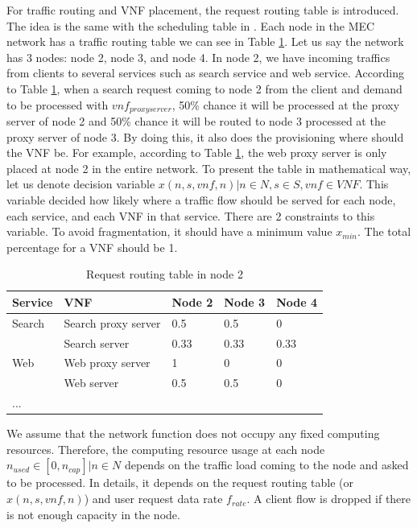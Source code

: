 \documentclass[conference]{IEEEtran}
\begin{document}
For traffic routing and VNF placement, the request routing table is introduced. The idea is the same with the scheduling table in \cite{9269087}. Each node in the MEC network has a traffic routing table we can see in Table \ref{tbl:traffic_routing}. Let us say the network has 3 nodes: node 2, node 3, and node 4. In node 2, we have incoming traffics from clients to several services such as search service and web service. According to Table \ref{tbl:traffic_routing}, when a search request coming to node 2 from the client and demand to be processed with $vnf_{proxy server}$, 50\% chance it will be processed at the proxy server of node 2 and 50\% chance it will be routed to node 3 processed at the proxy server of node 3. By doing this, it also does the provisioning where should the VNF be. For example, according to Table \ref{tbl:traffic_routing}, the web proxy server is only placed at node 2 in the entire network. To present the table in mathematical way, let us denote decision variable $x(n,s,vnf,n) | n \in N, s \in S, vnf \in VNF$. This variable decided how likely where a traffic flow should be served for each node, each service, and each VNF in that service. There are 2 constraints to this variable. To avoid fragmentation, it should have a minimum value $x_{min}$. The total percentage for a VNF should be 1.

\begin{table}[]
    \label{tbl:traffic_routing}
    \caption{Request routing table in node 2}
    \centering
    \begin{tabular}{|l|l|l|l|l|}
    \hline
    Service & VNF                 & Node 2 & Node 3 & Node 4 \\ \hline
    Search  & Search proxy server & 0.5    & 0.5    & 0      \\ \hline
            & Search server       & 0.33   & 0.33   & 0.33   \\ \hline
    Web     & Web proxy server    & 1      & 0      & 0      \\ \hline
            & Web server          & 0.5    & 0.5    & 0      \\ \hline
    ...     &                     &        &        &        \\ \hline
    \end{tabular}
\end{table}

We assume that the network function does not occupy any fixed computing resources. Therefore, the computing resource usage at each node $n_{used} \in [0, n_{cap}] | n \in N$ depends on the traffic load coming to the node and asked to be processed. In details, it depends on the request routing table (or $x(n,s,vnf,n)$) and user request data rate $f_{rate}$. A client flow is dropped if there is not enough capacity in the node.
\end{document}

